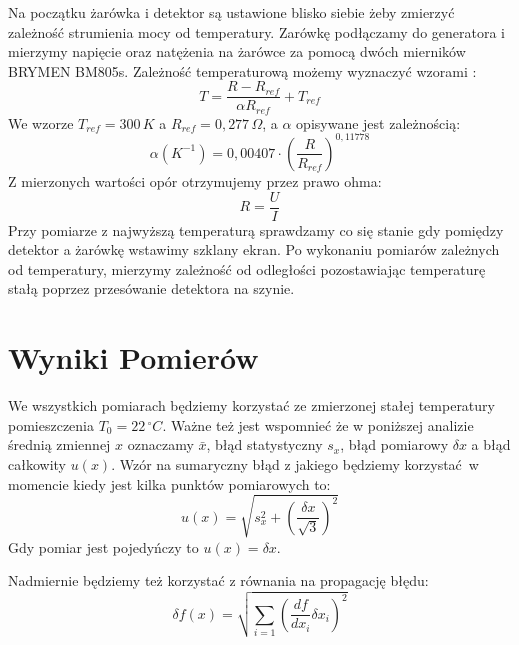 \documentclass[12pt]{article}
\begin{document}
Na początku żarówka i detektor są ustawione blisko siebie żeby zmierzyć zależność strumienia mocy od temperatury.
Zarówkę podłączamy do generatora i mierzymy napięcie oraz natężenia na żarówce za pomocą dwóch mierników BRYMEN BM805s. Zależność temperaturową możemy wyznaczyć wzorami \cite{skrypt}:
\begin{equation}
    T = \frac{R - R_{ref}}{\alpha R_{ref}} + T_{ref}
    \label{eq:temp_bulb}
\end{equation}
We wzorze $T_{ref} = 300\,K$ a $R_{ref} = 0{,}277\, \Omega$, a $\alpha$ opisywane jest zależnością:
\[
    \alpha(K^{-1}) = 0{,}00407 \cdot (\frac{R}{R_{ref}})^{0{,}11778}
\]
Z mierzonych wartości opór otrzymujemy przez prawo ohma:
\[
    R = \frac{U}{I}
\]
Przy pomiarze z najwyższą temperaturą sprawdzamy co się stanie gdy pomiędzy detektor a żarówkę wstawimy szklany ekran.
Po wykonaniu pomiarów zależnych od temperatury, mierzymy zależność od odległości pozostawiając temperaturę stałą poprzez przesówanie detektora na szynie.
\section{Wyniki Pomierów}
We wszystkich pomiarach będziemy korzystać ze zmierzonej stałej temperatury pomieszczenia $T_0 = 22 \, ^{\circ}C$.
Ważne też jest wspomnieć że w poniższej analizie średnią zmiennej $x$ oznaczamy $\bar{x}$, błąd statystyczny $s_x$, błąd pomiarowy $\delta x$ a błąd całkowity $u(x)$.
Wzór na sumaryczny błąd z jakiego będziemy korzystać w momencie kiedy jest kilka punktów pomiarowych to:
\begin{equation}
    u(x) = \sqrt{s_x^2 + (\frac{\delta x}{\sqrt{3}})^2}
    \label{eq:combined_error}
\end{equation}
Gdy pomiar jest pojedyńczy to $u(x) = \delta x$.

Nadmiernie będziemy też korzystać z równania na propagację błędu:
\begin{equation}
    \delta f(x) = \sqrt{\sum_{i=1} (\frac{df}{dx_i} \delta x_i)^2}
    \label{eq:error_propagation}
\end{equation}
\end{document}
